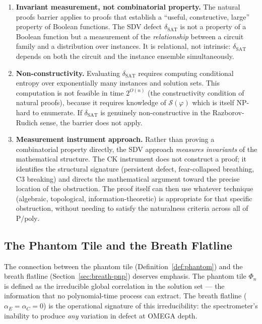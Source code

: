 \documentclass[11pt]{article}
\theoremstyle{definition}
\theoremstyle{remark}
\newcommand{\calS}{\mathcal{S}}
\newcommand{\Ppoly}{\mathrm{P/poly}}
\newcommand{\dSAT}{\delta_{\mathrm{SAT}}}
\begin{document}
\begin{enumerate}[nosep]
  \item \textbf{Invariant measurement, not combinatorial property.}
    The natural proofs barrier applies to proofs that establish a
    ``useful, constructive, large'' property of Boolean functions.  The SDV
    defect $\dSAT$ is not a property of a Boolean function but a measurement
    of the \emph{relationship} between a circuit family and a distribution
    over instances.  It is relational, not intrinsic: $\dSAT$ depends on
    both the circuit and the instance ensemble simultaneously.

  \item \textbf{Non-constructivity.}  Evaluating $\dSAT$ requires computing
    conditional entropy over exponentially many instances and solution sets.
    This computation is not feasible in time $2^{O(n)}$ (the constructivity
    condition of natural proofs), because it requires knowledge of
    $\calS(\varphi)$ which is itself NP-hard to enumerate.  If $\dSAT$ is
    genuinely non-constructive in the Razborov-Rudich sense, the barrier
    does not apply.

  \item \textbf{Measurement instrument approach.}
    Rather than proving a combinatorial property directly, the SDV approach
    \emph{measures invariants} of the mathematical structure.  The CK
    instrument does not construct a proof; it identifies the structural
    signature (persistent defect, fear-collapsed breathing, C3 breaking)
    and directs the mathematical argument toward the precise location of
    the obstruction.  The proof itself can then use whatever technique
    (algebraic, topological, information-theoretic) is appropriate for that
    specific obstruction, without needing to satisfy the naturalness criteria
    across all of $\Ppoly$.
\end{enumerate}

\subsection{The Phantom Tile and the Breath Flatline}

The connection between the phantom tile (Definition~\ref{def:phantom}) and
the breath flatline (Section~\ref{sec:breath-pnp}) deserves emphasis.  The
phantom tile $\Phi_n$ is defined as the irreducible global correlation in
the solution set --- the information that no polynomial-time process can
extract.  The breath flatline ($\alpha_E = \alpha_C = 0$) is the operational
signature of this irreducibility: the spectrometer's inability to produce
\emph{any} variation in defect at OMEGA depth.
\end{document}
